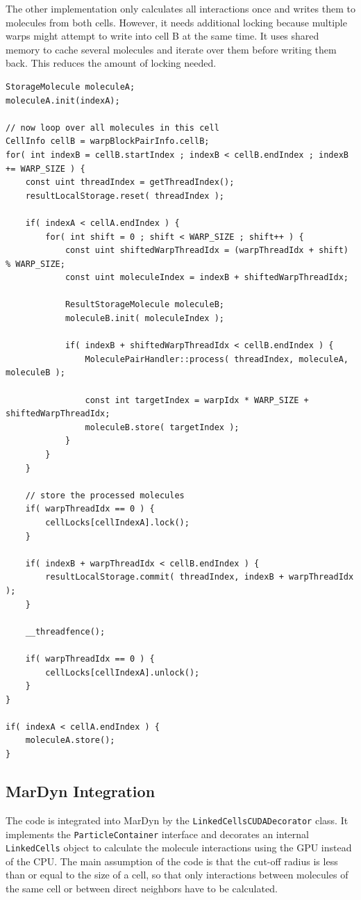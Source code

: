The other implementation only calculates all interactions once and writes them to molecules from both cells. However, it needs additional locking because multiple warps might attempt to write into cell B at the same time. It uses shared memory to cache several molecules and iterate over them before writing them back. This reduces the amount of locking needed.

\begin{lstlisting}[caption=inter-cell block processing with shared memory cache(warp block cell processor)]
StorageMolecule moleculeA;
moleculeA.init(indexA);

// now loop over all molecules in this cell
CellInfo cellB = warpBlockPairInfo.cellB;
for( int indexB = cellB.startIndex ; indexB < cellB.endIndex ; indexB += WARP_SIZE ) {
	const uint threadIndex = getThreadIndex();
	resultLocalStorage.reset( threadIndex );

	if( indexA < cellA.endIndex ) {
		for( int shift = 0 ; shift < WARP_SIZE ; shift++ ) {
			const uint shiftedWarpThreadIdx = (warpThreadIdx + shift) % WARP_SIZE;
			const uint moleculeIndex = indexB + shiftedWarpThreadIdx;

			ResultStorageMolecule moleculeB;
			moleculeB.init( moleculeIndex );

			if( indexB + shiftedWarpThreadIdx < cellB.endIndex ) {
				MoleculePairHandler::process( threadIndex, moleculeA, moleculeB );

				const int targetIndex = warpIdx * WARP_SIZE + shiftedWarpThreadIdx;
				moleculeB.store( targetIndex );
			}
		}
	}

	// store the processed molecules
	if( warpThreadIdx == 0 ) {
		cellLocks[cellIndexA].lock();
	}

	if( indexB + warpThreadIdx < cellB.endIndex ) {
		resultLocalStorage.commit( threadIndex, indexB + warpThreadIdx );
	}

	__threadfence();

	if( warpThreadIdx == 0 ) {
		cellLocks[cellIndexA].unlock();
	}
}

if( indexA < cellA.endIndex ) {
	moleculeA.store();
}
\end{lstlisting}

\subsection{MarDyn Integration}
The \cuda{} code is integrated into MarDyn by the \lstinline!LinkedCellsCUDADecorator! class. It implements the \lstinline!ParticleContainer! interface and decorates an internal \lstinline!LinkedCells! object to calculate the molecule interactions using the GPU instead of the CPU.
The main assumption of the code is that the cut-off radius is less than or equal to the size of a cell, so that only interactions between molecules of the same cell or between direct neighbors have to be calculated.

